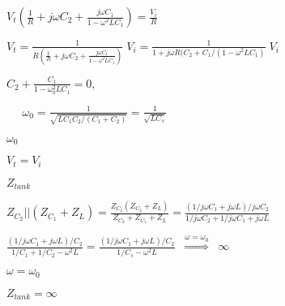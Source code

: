 \documentclass{article}
\def\lthtmlcheckvsize{\ifdim\ht\sizebox<\vsize 
  \ifdim\wd\sizebox<\hsize\expandafter\hfill\fi \expandafter\vfill
  \else\expandafter\vss\fi}%
\begin{document}
{\newpage\clearpage
{}%
$\displaystyle V_t\left(\frac{1}{R}+j\omega C_2+\frac{j\omega C_1}{1-\omega^2LC_1}\right)
=\frac{V_i}{R}$%
\lthtmlindisplaymathZ
\lthtmlcheckvsize\clearpage}

{\newpage\clearpage
{}%
$\displaystyle V_t=\frac{1}{R(\frac{1}{R}+j\omega C_2+\frac{j\omega C_1}
{1-\omega^2LC_1})}\;V_i
=\frac{1}{1+j\omega R(C_2+C_1/(1-\omega^2LC_1)}\;V_i$%
\lthtmlindisplaymathZ
\lthtmlcheckvsize\clearpage}

{\newpage\clearpage
{}%
$\displaystyle C_2+\frac{C_1}{1-\omega_0^2LC_1}=0,\;\;\;\;\;\;\;$%
\lthtmlindisplaymathZ
\lthtmlcheckvsize\clearpage}

{\newpage\clearpage
{}%
$\displaystyle \;\;\;\;\;
\omega_0=\frac{1}{\sqrt{LC_1C_2/(C_1+C_2)}}=\frac{1}{\sqrt{LC_s}}$%
\lthtmlindisplaymathZ
\lthtmlcheckvsize\clearpage}

{\newpage\clearpage
{}%
$ \omega_0$%
\lthtmlindisplaymathZ
\lthtmlcheckvsize\clearpage}

{\newpage\clearpage
{}%
$ V_t=V_i$%
\lthtmlindisplaymathZ
\lthtmlcheckvsize\clearpage}

{\newpage\clearpage
{}%
$\displaystyle Z_{tank}$%
\lthtmlindisplaymathZ
\lthtmlcheckvsize\clearpage}

{\newpage\clearpage
{}%
$\displaystyle Z_{C_2}||(Z_{C_1}+Z_L)=\frac{Z_{C_2}(Z_{C_2}+Z_L)}{Z_{C_2}+Z_{C_1}+Z_L}
=\frac{(1/j\omega C_1+j\omega L)/j\omega C_2}
{1/j\omega C_2+1/j\omega C_1+j\omega L}$%
\lthtmlindisplaymathZ
\lthtmlcheckvsize\clearpage}

{\newpage\clearpage
{}%
$\displaystyle \frac{(1/j\omega C_1+j\omega L)/C_2}{1/C_1+1/C_2-\omega^2 L}
=\frac{(1/j\omega C_1+j\omega L)/C_2}{1/C_s-\omega^2 L}
\;\;\stackrel{\omega=\omega_0}{\Longrightarrow}\;\;\infty$%
\lthtmlindisplaymathZ
\lthtmlcheckvsize\clearpage}

{\newpage\clearpage
{}%
$ \omega=\omega_0$%
\lthtmlindisplaymathZ
\lthtmlcheckvsize\clearpage}

{\newpage\clearpage
{}%
$ Z_{tank}=\infty$%
\lthtmlindisplaymathZ
\lthtmlcheckvsize\clearpage}
\end{document}
